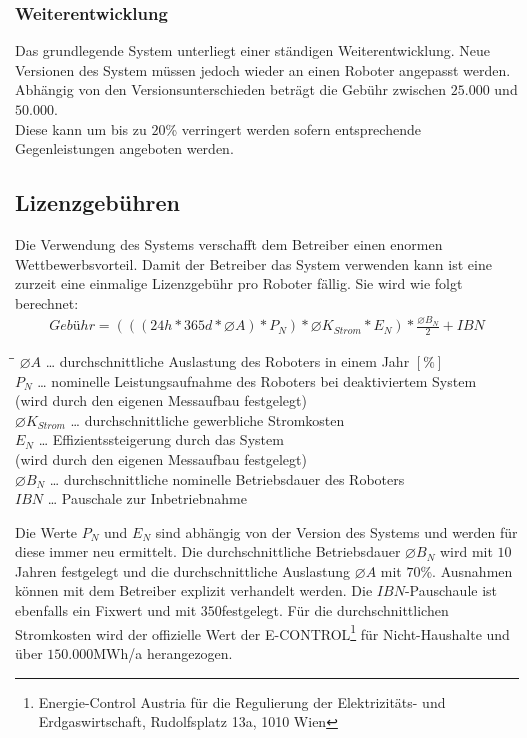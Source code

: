 \subsubsection{Weiterentwicklung}
Das grundlegende System unterliegt einer ständigen Weiterentwicklung. Neue Versionen des System müssen jedoch wieder an einen Roboter angepasst werden. Abhängig von den Versionsunterschieden beträgt die Gebühr zwischen $25.000$ und $50.000$\officialeuro.\\
Diese kann um bis zu $20$\% verringert werden sofern entsprechende Gegenleistungen angeboten werden.

\subsection{Lizenzgebühren}
Die Verwendung des Systems verschafft dem Betreiber einen enormen Wettbewerbsvorteil. Damit der Betreiber das System verwenden kann ist eine zurzeit eine einmalige Lizenzgebühr pro Roboter fällig. Sie wird wie folgt berechnet:\\
\begin{align*}
	Gebühr = (((24h * 365d * \varnothing A)*P_N)*\varnothing K_{Strom}*E_N)*\frac{\varnothing B_N}{2} + IBN
\end{align*}
\begin{tabbing}
	\hspace{1,8cm}\=\hspace{0,6cm}\=\kill
	$\varnothing A$ \> \dots \> durchschnittliche Auslastung des Roboters in einem Jahr $[\%]$\\ 
	$P_N$\> \dots \> nominelle Leistungsaufnahme des Roboters bei deaktiviertem System\\ 
	\> \> (wird durch den eigenen Messaufbau festgelegt)\\
	$\varnothing K_{Strom}$\> \dots \> durchschnittliche gewerbliche Stromkosten\\ 
	$E_N$\> \dots \> Effizientssteigerung durch das System\\ 
	\> \> (wird durch den eigenen Messaufbau festgelegt) \\
	$\varnothing B_N$ \> \dots \> durchschnittliche nominelle Betriebsdauer des Roboters \\
	$IBN$ \> \dots \> Pauschale zur Inbetriebnahme
\end{tabbing}
Die Werte $P_N$ und $E_N$ sind abhängig von der Version des Systems und werden für diese immer neu ermittelt. Die durchschnittliche Betriebsdauer $\varnothing B_N$ wird mit $10$ Jahren festgelegt und die durchschnittliche Auslastung $\varnothing A$ mit $70$\%. Ausnahmen können mit dem Betreiber explizit verhandelt werden. Die $IBN$-Pauschaule ist ebenfalls ein Fixwert und mit $350$\officialeuro festgelegt. Für die durchschnittlichen Stromkosten wird der offizielle Wert der \textsf{E-CONTROL}\footnote{Energie-Control Austria für die Regulierung der Elektrizitäts- und Erdgaswirtschaft, Rudolfsplatz 13a, 1010 Wien} für Nicht-Haushalte und über $150.000$MWh/a herangezogen.\\
